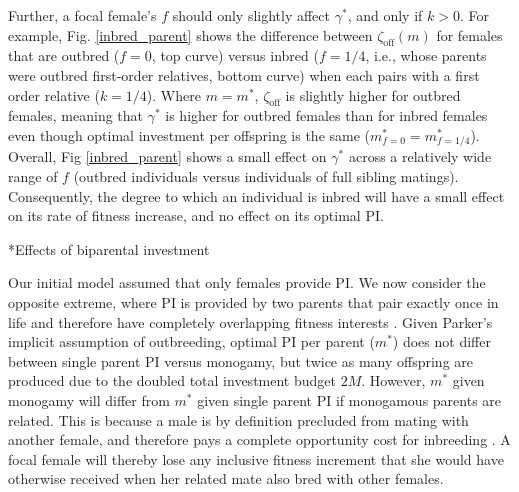 \documentclass[12pt]{article}
\makeatletter
\renewcommand\subsection{\@startsection{subsection}{1}{-0.25in}{-0.5\baselineskip}{0.1\baselineskip}{\normalfont\normalsize\bfseries\textit}}
\makeatother
\begin{document}
Further, a focal female's $f$ should only slightly affect $\gamma^{*}$, and only if $k>0$. For example, Fig. \ref{inbred_parent} shows the difference between $\zeta_{\textrm{off}}(m)$ for females that are outbred ($f=0$, top curve) versus inbred ($f=1/4$, i.e., whose parents were outbred first-order relatives, bottom curve) when each pairs with a first order relative ($k=1/4$). Where $m=m^{*}$, $\zeta_{\textrm{off}}$ is slightly higher for outbred females, meaning that $\gamma^{*}$ is higher for outbred females than for inbred females even though optimal investment per offspring is the same ($m^{*}_{f=0}=m^{*}_{f=1/4}$). Overall, Fig \ref{inbred_parent} shows a small effect on $\gamma^{*}$ across a relatively wide range of $f$ (outbred individuals versus individuals of full sibling matings). Consequently, the degree to which an individual is inbred will have a small effect on its rate of fitness increase, and no effect on its optimal PI.

\subsection*{Effects of biparental investment}

Our initial model assumed that only females provide PI. We now consider the opposite extreme, where PI is provided by two parents that pair exactly once in life and therefore have completely overlapping fitness interests \cite[i.e., strict monogamy;][]{Parker1985}. Given Parker's \citeyearpar{Parker1985} implicit assumption of outbreeding, optimal PI per parent ($m^{*}$) does not differ between single parent PI versus monogamy, but twice as many offspring are produced due to the doubled total investment budget $2M$. However, $m^{*}$ given monogamy will differ from $m^{*}$ given single parent PI if monogamous parents are related. This is because a male is by definition precluded from mating with another female, and therefore pays a complete opportunity cost for inbreeding \cite[][]{Waser1986}. A focal female will thereby lose any inclusive fitness increment that she would have otherwise received when her related mate also bred with other females. 
\end{document}
